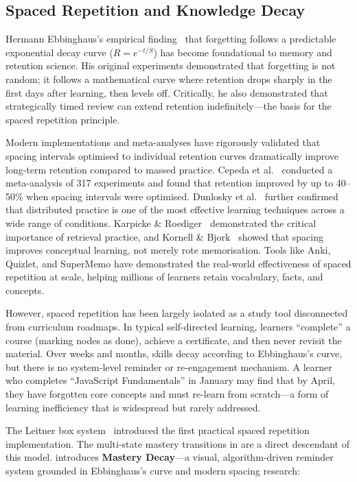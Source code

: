 \subsection{Spaced Repetition and Knowledge Decay}
\label{sec:spaced-repetition}

Hermann Ebbinghaus's empirical finding~\cite{ebbinghaus1885} that forgetting follows a predictable exponential decay curve (\(R = e^{-t/S}\)) has become foundational to memory and retention science. His original experiments demonstrated that forgetting is not random; it follows a mathematical curve where retention drops sharply in the first days after learning, then levels off. Critically, he also demonstrated that strategically timed review can extend retention indefinitely---the basis for the spaced repetition principle.

Modern implementations and meta-analyses have rigorously validated that spacing intervals optimised to individual retention curves dramatically improve long-term retention compared to massed practice. Cepeda et al.~\cite{cepEDA2006} conducted a meta-analysis of 317 experiments and found that retention improved by up to 40--50\% when spacing intervals were optimised. Dunlosky et al.~\cite{dunlosky2013} further confirmed that distributed practice is one of the most effective learning techniques across a wide range of conditions. Karpicke \& Roediger~\cite{karpicke2008} demonstrated the critical importance of retrieval practice, and Kornell \& Bjork~\cite{kornell2008} showed that spacing improves conceptual learning, not merely rote memorisation. Tools like Anki, Quizlet, and SuperMemo have demonstrated the real-world effectiveness of spaced repetition at scale, helping millions of learners retain vocabulary, facts, and concepts.

However, spaced repetition has been largely isolated as a study tool disconnected from curriculum roadmaps. In typical self-directed learning, learners \enquote{complete} a course (marking nodes as done), achieve a certificate, and then never revisit the material. Over weeks and months, skills decay according to Ebbinghaus's curve, but there is no system-level reminder or re-engagement mechanism. A learner who completes \enquote{JavaScript Fundamentals} in January may find that by April, they have forgotten core concepts and must re-learn from scratch---a form of learning inefficiency that is widespread but rarely addressed.

The Leitner box system~\cite{leitner1972} introduced the first practical spaced repetition implementation. The multi-state mastery transitions in \projectname{} are a direct descendant of this model. \projectname{} introduces \textbf{Mastery Decay}---a visual, algorithm-driven reminder system grounded in Ebbinghaus's curve and modern spacing research:

